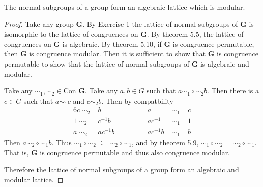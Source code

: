 \begin{theorem*}
The normal subgroups of a group form an algebraic lattice which is modular.
\end{theorem*}

\begin{proof}
Take any group $\mathbf{G}$.
By Exercise 1 the lattice of normal subgroups of $\mathbf{G}$ is isomorphic to the lattice of congruences on $\mathbf{G}$.
By theorem 5.5, the lattice of congruences on $\mathbf{G}$ is algebraic.
By theorem 5.10, if $\mathbf{G}$ is congruence permutable, then $\mathbf{G}$ is congruence modular.
Then it is sufficient to show that $\mathbf{G}$ is congruence permutable to show that the lattice of normal subgroups of $\mathbf{G}$ is algebraic and modular.

Take any $\sim_1, \sim_2 \in \text{Con }\mathbf{G}$.
Take any $a, b \in G$ such that $a \sim_1 \circ \sim_2 b$.
Then there is a $c \in G$ such that $a \sim_1 c$ and $c \sim_2 b$.
Then by compatbility
\begin{alignat*}{6}
c \;\sim_2\; & b        & \quad\quad\quad & a        & \;\sim_1\; & c \\
1 \;\sim_2\; & c^{-1}b  & \quad\quad\quad & ac^{-1}  & \;\sim_1\; & 1 \\
a \;\sim_2\; & ac^{-1}b & \quad\quad\quad & ac^{-1}b & \;\sim_1\; & b
\end{alignat*}
Then $a \sim_2 \circ \sim_1 b$.
Thus $\sim_1 \circ \sim_2 \;\subseteq\; \sim_2 \circ \sim_1$, and by theorem 5.9, $\sim_1 \circ \sim_2 = \sim_2 \circ \sim_1$.
That is, $\mathbf{G}$ is congruence permutable and thus also congruence modular.

Therefore the lattice of normal subgroups of a group form an algebraic and modular lattice.
\end{proof}
